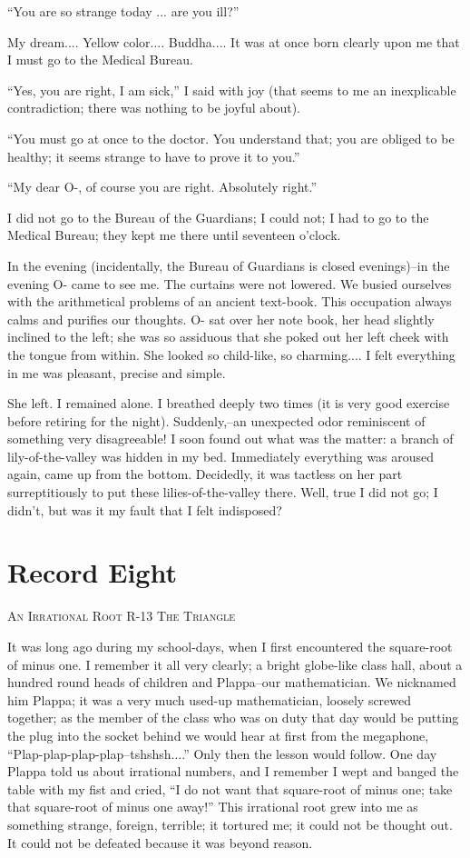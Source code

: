 \documentclass[11pt,openany]{book}
\newcommand{\bookchapterplain}[1]{%
  \clearpage\phantomsection
  \chapter*{#1}%
  \addcontentsline{toc}{chapter}{#1}%
  \markboth{#1}{#1}\thispagestyle{plain}}
\begin{document}
``You are so strange today ... are you ill?''

My dream.... Yellow color.... Buddha.... It was at once born clearly upon me that I must go to the Medical Bureau.

``Yes, you are right, I am sick,'' I said with joy (that seems to me an inexplicable contradiction; there was nothing to be joyful about).

``You must go at once to the doctor. You understand that; you are obliged to be healthy; it seems strange to have to prove it to you.''

``My dear O-, of course you are right. Absolutely right.''

I did not go to the Bureau of the Guardians; I could not; I had to go to the Medical Bureau; they kept me there until seventeen o'clock.

In the evening (incidentally, the Bureau of Guardians is closed evenings)--in the evening O- came to see me. The curtains were not lowered. We busied ourselves with the arithmetical problems of an ancient text-book. This occupation always calms and purifies our thoughts. O- sat over her note book, her head slightly inclined to the left; she was so assiduous that she poked out her left cheek with the tongue from within. She looked so child-like, so charming.... I felt everything in me was pleasant, precise and simple.

She left. I remained alone. I breathed deeply two times (it is very good exercise before retiring for the night). Suddenly,--an unexpected odor reminiscent of something very disagreeable! I soon found out what was the matter: a branch of lily-of-the-valley was hidden in my bed. Immediately everything was aroused again, came up from the bottom. Decidedly, it was tactless on her part surreptitiously to put these lilies-of-the-valley there. Well, true I did not go; I didn't, but was it my fault that I felt indisposed?

\bookchapterplain{Record Eight}

\begin{center}\textsc{An Irrational Root R-13 The Triangle}\end{center}

It was long ago during my school-days, when I first encountered the square-root of minus one. I remember it all very clearly; a bright globe-like class hall, about a hundred round heads of children and Plappa--our mathematician. We nicknamed him Plappa; it was a very much used-up mathematician, loosely screwed together; as the member of the class who was on duty that day would be putting the plug into the socket behind we would hear at first from the megaphone, ``Plap-plap-plap-plap--tshshsh....'' Only then the lesson would follow. One day Plappa told us about irrational numbers, and I remember I wept and banged the table with my fist and cried, ``I do not want that square-root of minus one; take that square-root of minus one away!'' This irrational root grew into me as something strange, foreign, terrible; it tortured me; it could not be thought out. It could not be defeated because it was beyond reason.
\end{document}

